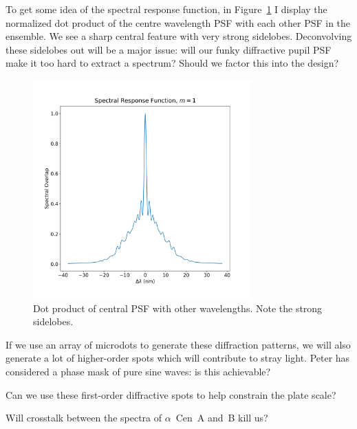 \documentclass[a4paper,12pt]{article}
\begin{document}
To get some idea of the spectral response function, in Figure~\ref{response} I display the normalized dot product of the centre wavelength PSF with each other PSF in the ensemble. We see a sharp central feature with very strong sidelobes. Deconvolving these sidelobes out will be a major issue: will our funky diffractive pupil PSF make it too hard to extract a spectrum? Should we factor this into the design?

\begin{figure}
\centering
\includegraphics[width=0.75\textwidth]{specresponse.png}
\caption{Dot product of central PSF with other wavelengths. Note the strong sidelobes.}
\label{response}
\end{figure}

If we use an array of microdots to generate these diffraction patterns, we will also generate a lot of higher-order spots which will contribute to stray light. Peter has considered a phase mask of pure sine waves: is this achievable?

Can we use these first-order diffractive spots to help constrain the plate scale?

Will crosstalk between the spectra of $\alpha$~Cen~A and~B kill us?
\end{document}

